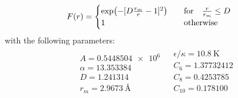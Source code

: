 \documentclass[Thesis.tex]{subfiles}
\begin{document}
\begin{align}
    F(r) &= \begin{cases}
        \exp( - [D \frac{r_m}{r} -  1]^2 ) & \qfor \frac{r}{r_m} \leq D\\
        1 & \qotherwise
    \end{cases}
\end{align}
with the following parameters: 
\begin{align}\label{eq:HFDHE2-parameters}
    \begin{split}
        &A = \num{0.5448504e6}\\
        &\alpha = \num{13.353384}\\
        &D = \num{1.241314}\\
        &r_m= \SI{2.9673}{\angstrom}
    \end{split}
    \begin{split}
        &\epsilon/\kappa = \SI{10.8}{\K}\\
        &C_6= \num{1.37732412}\\
        &C_8= \num{0.4253785}\\
        &C_{10}= \num{0.178100}\\
    \end{split}
\end{align}
\end{document}

